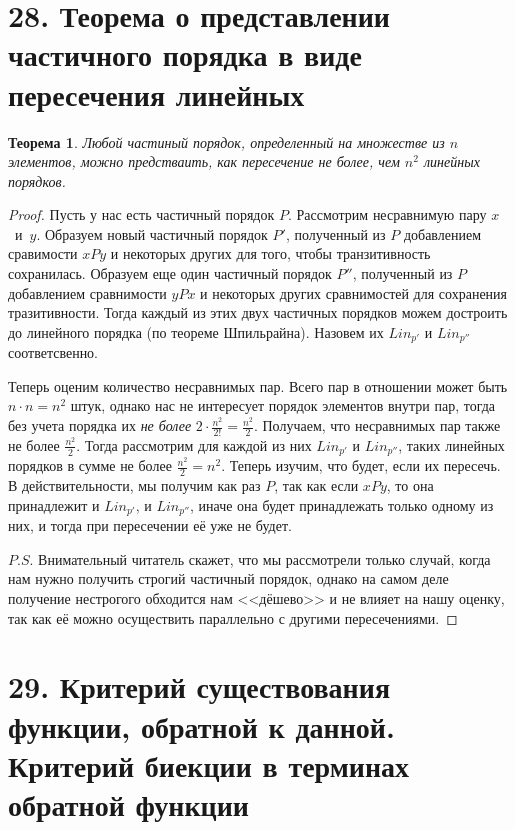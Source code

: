\documentclass[a4paper,12pt]{article}
\newtheorem{Theorem}{Теорема}
\begin{document}
        \section*{28. Теорема о представлении частичного порядка в виде пересечения линейных}
        \begin{Theorem}
            Любой частиный порядок, определенный на множестве из $n$ элементов, можно предстваить, как пересечение не более, чем $n^2$ линейных порядков.
        \end{Theorem}
        
        \begin{proof}
        
            Пусть у нас есть частичный порядок $P$. Рассмотрим несравнимую пару $x$~и~$y$. Образуем новый частичный порядок $P'$, полученный из $P$ добавлением сравимости $xPy$
            и некоторых других для того, чтобы транзитивность сохранилась. Образуем еще один частичный порядок $P''$, полученный из $P$ добавлением сравнимости $yPx$ и некоторых
            других сравнимостей для сохранения тразитивности. Тогда каждый из этих двух частичных порядков можем достроить до линейного порядка (по теореме Шпильрайна).
            Назовем их $Lin_{p'}$ и $Lin_{p''}$ соответсвенно.
            
            Теперь оценим количество несравнимых пар. Всего пар в отношении может быть $n \cdot n = n^2$ штук, однако нас не интересует порядок элементов внутри пар, 
            тогда без учета порядка их  \textit{не более} $2 \cdot \frac{n^2}{2!} = \frac{n^2}{2}$. Получаем, что несравнимых пар также не более $\frac{n^2}{2}$. Тогда рассмотрим для каждой из них
            $Lin_{p'}$ и $Lin_{p''}$, таких линейных порядков в сумме не более $\frac{n^2}{2} = n^2$. Теперь изучим, что будет, если их пересечь. В действительности, мы получим как раз $P$,
            так как если $xPy$, то она принадлежит и $Lin_{p'}$, и $Lin_{p''}$, иначе она будет принадлежать только одному из них, и тогда при пересечении её уже не будет.
            
            $P.S.$ Внимательный читатель скажет, что мы рассмотрели только случай, когда нам нужно получить строгий частичный порядок, однако на самом деле получение нестрогого
            обходится нам <<дёшево>> и не влияет на нашу оценку, так как её можно осуществить параллельно с другими пересечениями.
            
           
        \end{proof}

        \section*{29. Критерий существования функции, обратной к данной. Критерий биекции в терминах обратной функции}
\end{document}
